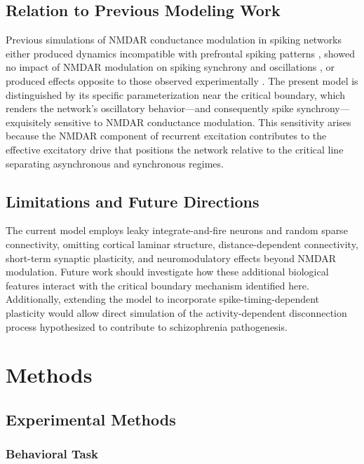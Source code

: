 \documentclass[12pt]{article}
\begin{document}
\subsection{Relation to Previous Modeling Work}

Previous simulations of NMDAR conductance modulation in spiking networks either produced dynamics incompatible with prefrontal spiking patterns \citep{Kirli2014}, showed no impact of NMDAR modulation on spiking synchrony and oscillations \citep{BrunelWang2003}, or produced effects opposite to those observed experimentally \citep{Compte2000}. The present model is distinguished by its specific parameterization near the critical boundary, which renders the network's oscillatory behavior---and consequently spike synchrony---exquisitely sensitive to NMDAR conductance modulation. This sensitivity arises because the NMDAR component of recurrent excitation contributes to the effective excitatory drive that positions the network relative to the critical line separating asynchronous and synchronous regimes.

\subsection{Limitations and Future Directions}

The current model employs leaky integrate-and-fire neurons and random sparse connectivity, omitting cortical laminar structure, distance-dependent connectivity, short-term synaptic plasticity, and neuromodulatory effects beyond NMDAR modulation. Future work should investigate how these additional biological features interact with the critical boundary mechanism identified here. Additionally, extending the model to incorporate spike-timing-dependent plasticity would allow direct simulation of the activity-dependent disconnection process hypothesized to contribute to schizophrenia pathogenesis.

\section{Methods}

\subsection{Experimental Methods}

\subsubsection{Behavioral Task}
\end{document}
